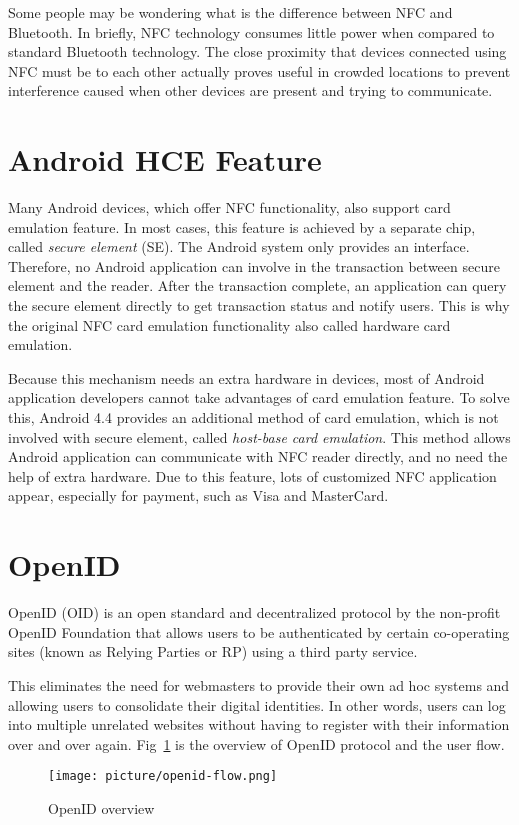 \begin{CJK}{Bg5}{bsmi}
Some people may be wondering what is the difference between NFC and Bluetooth. In briefly, NFC technology consumes little power when compared to standard Bluetooth technology\cite{nfc-ble-1}\cite{nfc-ble-2}. The close proximity that devices connected using NFC must be to each other actually proves useful in crowded locations to prevent interference caused when other devices are present and trying to communicate. 

\section{Android HCE Feature}

Many Android devices, which offer NFC functionality, also support card emulation feature. In most cases, this feature is achieved by a separate chip, called \emph{secure element} (SE). The Android system only provides an interface. Therefore, no Android application can involve in the transaction between secure element and the reader. After the transaction complete, an application can query the secure element directly to get transaction status and notify users. This is why the original NFC card emulation functionality also called hardware card emulation.

Because this mechanism needs an extra hardware in devices, most of Android application developers cannot take advantages of card emulation feature. To solve this, Android 4.4 provides an additional method of card emulation, which is not involved with secure element, called \emph{host-base card emulation}. This method allows Android application can communicate with NFC reader directly, and no need the help of extra hardware. Due to this feature, lots of customized NFC application appear, especially for payment, such as Visa and MasterCard\cite{nfc-visa}.

\section{OpenID}

OpenID (OID)\cite{openid} is an open standard and decentralized protocol by the non-profit OpenID Foundation that allows users to be authenticated by certain co-operating sites (known as Relying Parties or RP) using a third party service. 

This eliminates the need for webmasters to provide their own ad hoc systems and allowing users to consolidate their digital identities. In other words, users can log into multiple unrelated websites without having to register with their information over and over again. Fig~\ref{fig:openid-flow} is the overview of OpenID protocol and the user flow.
\begin{figure}
\centering
\texttt{[image: picture/openid-flow.png]}
\caption{OpenID overview\cite{openid-flow}}
\label{fig:openid-flow}
\end{figure}


\end{CJK}
